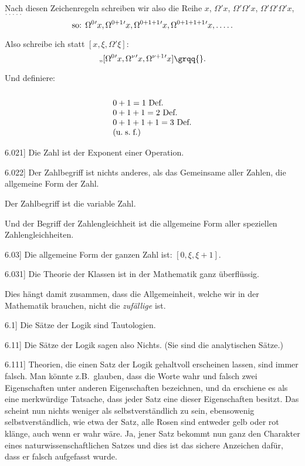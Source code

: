 \documentclass[12pt,oneside]{book}[2007/10/19]
\newcommand{\PropERef}[1]{\hyperref[PropE:#1]{#1}}
\newcommand{\PropositionG}[2]{%
  \item[\phantomsection\label{PropG:#1}\PropERef{#1}] #2%
}
\newcommand{\Emph}[1]{\emph{#1}}%
\newcommand{\zumBeispiel}{z.\;B.}
\newcommand{\undSoFort}{u.\;s.\;f.}
\newcommand{\fivedots}{\mathinner{\ldotp\ldotp\ldotp\ldotp\ldotp}}
\begin{document}
\begin{propositions}
{Nach diesen Zeichenregeln schreiben wir also
die Reihe $x$, $\Omega'x$, $\Omega'\Omega'x$, $\Omega'\Omega'\Omega'x$, $\fivedots$
\[
\text{so: }\Omega^{0}{}'x, \Omega^{0+1}{}'x, \Omega^{0+1+1}{}'x, \Omega^{0+1+1+1}{}'x, \fivedots
\]

Also schreibe ich statt \glqq{}$[x, \xi, \Omega'\xi]$\grqq{}:
\[
\text{\quotedblbase} [\Omega^{0}{}'x, \Omega^{\nu}{}'x, \Omega^{\nu+1}{}'x]\text{\grqq{}.}
\]

Und definiere:
\[
\begin{array}{l}\\
0 + 1 = 1\text{ Def.}\\
0 + 1 + 1 = 2\text{ Def.}\\
0 + 1 + 1 + 1 = 3\text{ Def.}\\
\text{(\undSoFort)}
\end{array}
\]
}


\PropositionG{6.021}
{Die Zahl ist der Exponent einer Operation.}


\PropositionG{6.022}
{Der Zahlbegriff ist nichts anderes, als das
Gemeinsame aller Zahlen, die allgemeine Form
der Zahl.

Der Zahlbegriff ist die variable Zahl.

Und der Begriff der Zahlengleichheit ist die
allgemeine Form aller speziellen Zahlengleichheiten.}


\PropositionG{6.03}
{Die allgemeine Form der ganzen Zahl ist:
$[0, \xi, \xi + 1]$.}


\PropositionG{6.031}
{Die Theorie der Klassen ist in der Mathematik
ganz überflüssig.

Dies hängt damit zusammen, dass die Allgemeinheit,
welche wir in der Mathematik brauchen,
nicht die \Emph{zufällige} ist.}


\PropositionG{6.1}
{Die Sätze der Logik sind Tautologien.}


\PropositionG{6.11}
{Die Sätze der Logik sagen also Nichts. (Sie
sind die analytischen Sätze.)}


\PropositionG{6.111}
{Theorien, die einen Satz der Logik gehaltvoll
erscheinen lassen, sind immer falsch. Man könnte
\zumBeispiel\ glauben, dass die Worte \glqq{}wahr\grqq{} und \glqq{}falsch\grqq{}
zwei Eigenschaften unter anderen Eigenschaften
bezeichnen, und da erschiene es als eine merkwürdige
Tatsache, dass jeder Satz eine dieser
Eigenschaften besitzt. Das scheint nun nichts
weniger als selbstverständlich zu sein, ebensowenig
selbstverständlich, wie etwa der Satz, \glqq{}alle Rosen
sind entweder gelb oder rot\grqq{} klänge, auch wenn er
wahr wäre. Ja, jener Satz bekommt nun ganz
den Charakter eines naturwissenschaftlichen Satzes
und dies ist das sichere Anzeichen dafür, dass er
falsch aufgefasst wurde.}



\end{propositions}
\end{document}
